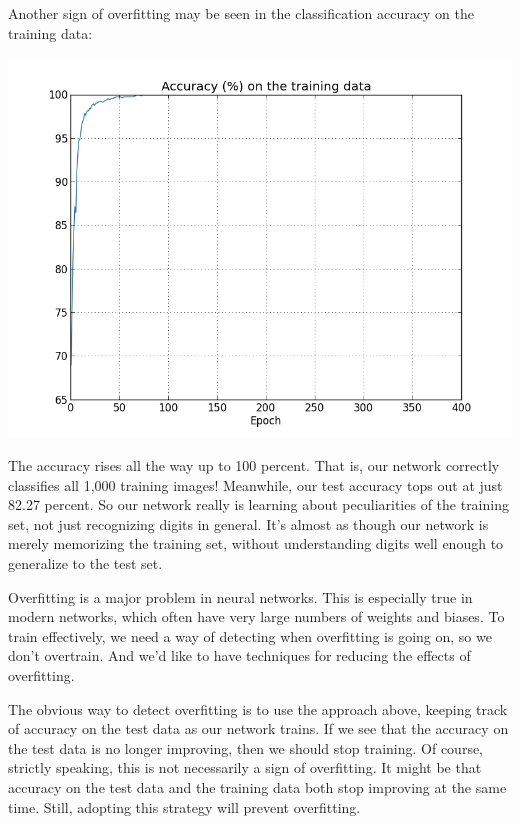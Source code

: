 \documentclass[a4paper,twoside,10pt]{book}
\begin{document}
Another sign of overfitting may be seen in the classification accuracy on the training data:
\begin{center}
	\includegraphics[width=0.6\linewidth]{figures/ch3/overfitting4}
\end{center}
The accuracy rises all the way up to 100 percent. That is, our network correctly classifies all 1,000 training images! Meanwhile, our test accuracy tops out at just 82.27 percent. So our network really is learning about peculiarities of the training set, not just recognizing digits in general. It's almost as though our network is merely memorizing the training set, without understanding digits well enough to generalize to the test set.

Overfitting is a major problem in neural networks. This is especially true in modern networks, which often have very large numbers of weights and biases. To train effectively, we need a way of detecting when overfitting is going on, so we don't overtrain. And we'd like to have techniques for reducing the effects of overfitting.

The obvious way to detect overfitting is to use the approach above, keeping track of accuracy on the test data as our network trains. If we see that the accuracy on the test data is no longer improving, then we should stop training. Of course, strictly speaking, this is not necessarily a sign of overfitting. It might be that accuracy on the test data and the training data both stop improving at the same time. Still, adopting this strategy will prevent overfitting.
\end{document}

